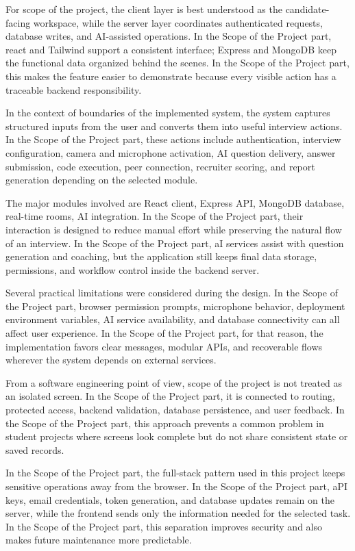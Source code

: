 \documentclass[12pt,a4paper]{report}
\begin{document}
For scope of the project, the client layer is best understood as the candidate-facing workspace, while the server layer coordinates authenticated requests, database writes, and AI-assisted operations. In the Scope of the Project part, react and Tailwind support a consistent interface; Express and MongoDB keep the functional data organized behind the scenes. In the Scope of the Project part, this makes the feature easier to demonstrate because every visible action has a traceable backend responsibility.


In the context of boundaries of the implemented system, the system captures structured inputs from the user and converts them into useful interview actions. In the Scope of the Project part, these actions include authentication, interview configuration, camera and microphone activation, AI question delivery, answer submission, code execution, peer connection, recruiter scoring, and report generation depending on the selected module.


The major modules involved are React client, Express API, MongoDB database, real-time rooms, AI integration. In the Scope of the Project part, their interaction is designed to reduce manual effort while preserving the natural flow of an interview. In the Scope of the Project part, aI services assist with question generation and coaching, but the application still keeps final data storage, permissions, and workflow control inside the backend server.


Several practical limitations were considered during the design. In the Scope of the Project part, browser permission prompts, microphone behavior, deployment environment variables, AI service availability, and database connectivity can all affect user experience. In the Scope of the Project part, for that reason, the implementation favors clear messages, modular APIs, and recoverable flows wherever the system depends on external services.


From a software engineering point of view, scope of the project is not treated as an isolated screen. In the Scope of the Project part, it is connected to routing, protected access, backend validation, database persistence, and user feedback. In the Scope of the Project part, this approach prevents a common problem in student projects where screens look complete but do not share consistent state or saved records.


In the Scope of the Project part, the full-stack pattern used in this project keeps sensitive operations away from the browser. In the Scope of the Project part, aPI keys, email credentials, token generation, and database updates remain on the server, while the frontend sends only the information needed for the selected task. In the Scope of the Project part, this separation improves security and also makes future maintenance more predictable.
\end{document}
